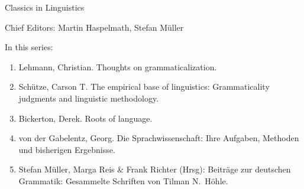 {\large Classics in Linguistics}

\bigskip

Chief Editors: Martin Haspelmath, Stefan Müller

\bigskip

In this series:

\begin{enumerate}
\item Lehmann, Christian. Thoughts on grammaticalization.
\item Schütze, Carson T. The empirical base of linguistics: Grammaticality judgments and linguistic methodology.
\item Bickerton, Derek. Roots of language.
\item von der Gabelentz, Georg. Die Sprachwissenschaft:  Ihre Aufgaben, Methoden und bisherigen Ergebnisse.
\item Stefan Müller, Marga Reis \& Frank Richter (Hrsg): Beiträge zur deutschen Grammatik: Gesammelte Schriften von Tilman N.\ Höhle.
\end{enumerate}


\vfill

